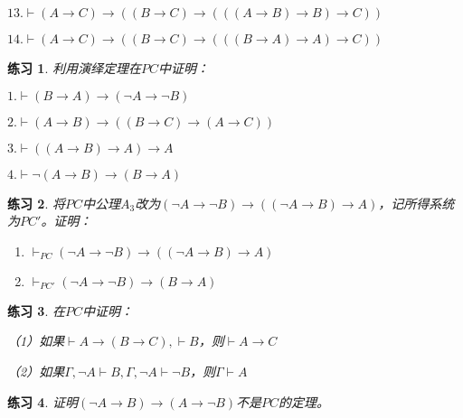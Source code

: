 \documentclass{article}
\newtheorem{Exercise}{练习}
\begin{document}
\begin{CJK*}{UTF8}{gbsn}
$13.\vdash (A\to C)\to ((B\to C)\to (((A\to B)\to B)\to C))$

$14.\vdash (A\to C)\to ((B\to C)\to (((B\to A)\to A)\to C))$
\begin{Exercise}
  利用演绎定理在$PC$中证明：
\end{Exercise}

$1.\vdash (B\to A)\to (\lnot A\to \lnot B)$

$2.\vdash (A\to B)\to ((B\to C)\to (A\to C))$

$3.\vdash ((A\to B)\to A)\to A$

$4.\vdash \lnot (A\to B)\to (B\to A)$



\begin{Exercise}
  将$PC$中公理$A_3$改为$(\lnot A\to \lnot B)\to ((\lnot A\to B)\to A)$，记所得系统为$PC'$。证明：
\begin{enumerate}
  \item $\vdash_{PC} (\lnot A\to \lnot B)\to ((\lnot A\to B)\to A)$
  \item $\vdash_{PC'}(\lnot A\to \lnot B)\to (B\to A)$
\end{enumerate}
\end{Exercise}

\begin{Exercise}
  在$PC$中证明：

  （1）如果$\vdash A\to (B\to C),\vdash B$，则$\vdash A\to C$

  （2）如果$\Gamma, \lnot A\vdash B, \Gamma, \lnot A\vdash \lnot B$，则$\Gamma\vdash A$
\end{Exercise}

\begin{Exercise}
  证明$(\lnot A\to B)\to (A\to \lnot B)$不是$PC$的定理。
\end{Exercise}

\end{CJK*}
\end{document}
